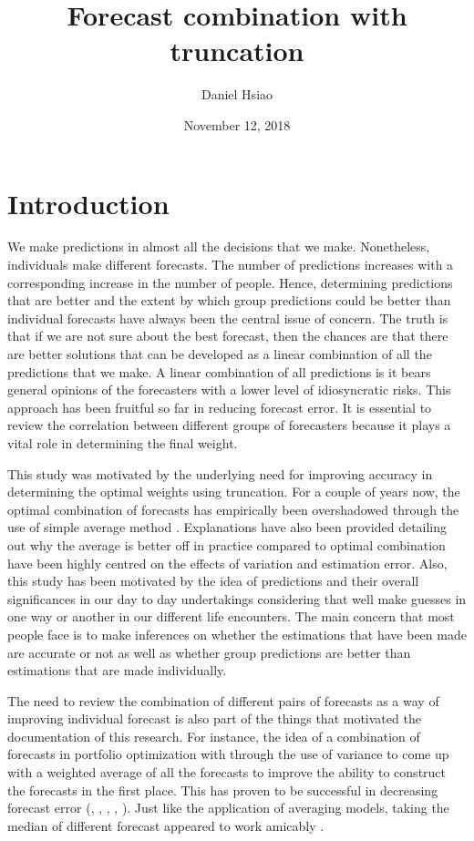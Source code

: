 \documentclass[11pt]{article}
\title{Forecast combination with truncation}
\author{Daniel Hsiao}
\date{November 12, 2018}
\begin{document}
\maketitle
\newpage
{
	\setcounter{tocdepth}{3}
	\tableofcontents
}
\newpage

\section{Introduction}\label{introduction}
We make predictions in almost all the decisions that we make. Nonetheless, individuals make different forecasts. The number of predictions increases with a corresponding increase in the number of people. Hence, determining predictions that are better and the extent by which group predictions could be better than individual forecasts have always been the central issue of concern. The truth is that if we are not sure about the best forecast, then the chances are that there are better solutions that can be developed as a linear combination of all the predictions that we make. A linear combination of all predictions is it bears general opinions of the forecasters with a lower level of idiosyncratic risks. This approach has been fruitful so far in reducing forecast error. It is essential to review the correlation between different groups of forecasters because it plays a vital role in determining the final weight.

This study was motivated by the underlying need for improving accuracy in determining the optimal weights using truncation. For a couple of years now, the optimal combination of forecasts has empirically been overshadowed through the use of simple average method \citep{Bates1969}. Explanations have also been provided detailing out why the average is better off in practice compared to optimal combination have been highly centred on the effects of variation and estimation error. Also, this study has been motivated by the idea of predictions and their overall significances in our day to day undertakings considering that well make guesses in one way or another in our different life encounters. The main concern that most people face is to make inferences on whether the estimations that have been made are accurate or not as well as whether group predictions are better than estimations that are made individually. 

The need to review the combination of different pairs of forecasts as a way of improving individual forecast is also part of the things that motivated the documentation of this research. For instance, the idea of a combination of forecasts in portfolio optimization with through the use of variance to come up with a weighted average of all the forecasts to improve the ability to construct the forecasts in the first place. This has proven to be successful in decreasing forecast error (\cite{Clemen1989}, \cite{Diebold1996}, \cite{Chen1999} , \cite{Dunis2000}, \cite{Stock2004}). Just like the application of averaging models, taking the median of different forecast appeared to work amicably \citep{Claeskens2014}.
\end{document}
